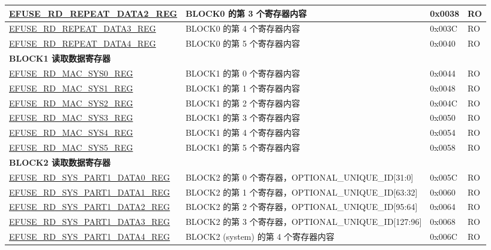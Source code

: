 \begin{longtable}{ | p{7cm} | p{7.2cm} | p{1.3cm} | p{1cm} | }
\hyperref[regdesc:EFUSERDREPEATDATA2REG]{EFUSE\_RD\_REPEAT\_DATA2\_REG} & BLOCK0 的第 3 个寄存器内容 & 0x0038 & RO \\ \hline
\hyperref[regdesc:EFUSERDREPEATDATA3REG]{EFUSE\_RD\_REPEAT\_DATA3\_REG} & BLOCK0 的第 4 个寄存器内容 & 0x003C & RO \\ \hline
\hyperref[regdesc:EFUSERDREPEATDATA4REG]{EFUSE\_RD\_REPEAT\_DATA4\_REG} & BLOCK0 的第 5 个寄存器内容 & 0x0040 & RO \\ \hline
\multicolumn{4}{|l|}{\textbf{BLOCK1 读取数据寄存器}} \\ \hline
\hyperref[regdesc:EFUSERDMACSYS0REG]{EFUSE\_RD\_MAC\_SYS0\_REG} & BLOCK1 的第 0 个寄存器内容 & 0x0044 & RO \\ \hline
\hyperref[regdesc:EFUSERDMACSYS1REG]{EFUSE\_RD\_MAC\_SYS1\_REG} & BLOCK1 的第 1 个寄存器内容 & 0x0048 & RO \\ \hline
\hyperref[regdesc:EFUSERDMACSYS2REG]{EFUSE\_RD\_MAC\_SYS2\_REG} & BLOCK1 的第 2 个寄存器内容 & 0x004C & RO \\ \hline
\hyperref[regdesc:EFUSERDMACSYS3REG]{EFUSE\_RD\_MAC\_SYS3\_REG} & BLOCK1 的第 3 个寄存器内容 & 0x0050 & RO \\ \hline
\hyperref[regdesc:EFUSERDMACSYS4REG]{EFUSE\_RD\_MAC\_SYS4\_REG} & BLOCK1 的第 4 个寄存器内容 & 0x0054 & RO \\ \hline
\hyperref[regdesc:EFUSERDMACSYS5REG]{EFUSE\_RD\_MAC\_SYS5\_REG} & BLOCK1 的第 5 个寄存器内容 & 0x0058 & RO \\ \hline
\multicolumn{4}{|l|}{\textbf{BLOCK2 读取数据寄存器}} \\ \hline
\hyperref[regdesc:EFUSERDSYSPART1DATA0REG]{EFUSE\_RD\_SYS\_PART1\_DATA0\_REG} & BLOCK2 的第 0 个寄存器，OPTIONAL\_UNIQUE\_ID[31:0] & 0x005C & RO \\ \hline
\hyperref[regdesc:EFUSERDSYSPART1DATA1REG]{EFUSE\_RD\_SYS\_PART1\_DATA1\_REG} & BLOCK2 的第 1 个寄存器，OPTIONAL\_UNIQUE\_ID[63:32] & 0x0060 & RO \\ \hline
\hyperref[regdesc:EFUSERDSYSPART1DATA2REG]{EFUSE\_RD\_SYS\_PART1\_DATA2\_REG} & BLOCK2 的第 2 个寄存器，OPTIONAL\_UNIQUE\_ID[95:64] & 0x0064 & RO \\ \hline
\hyperref[regdesc:EFUSERDSYSPART1DATA3REG]{EFUSE\_RD\_SYS\_PART1\_DATA3\_REG} & BLOCK2 的第 3 个寄存器，OPTIONAL\_UNIQUE\_ID[127:96] & 0x0068 & RO \\ \hline
\hyperref[regdesc:EFUSERDSYSPART1DATA4TO7REG]{EFUSE\_RD\_SYS\_PART1\_DATA4\_REG} & BLOCK2 (system) 的第 4 个寄存器内容 & 0x006C & RO \\ \hline

\end{longtable}
